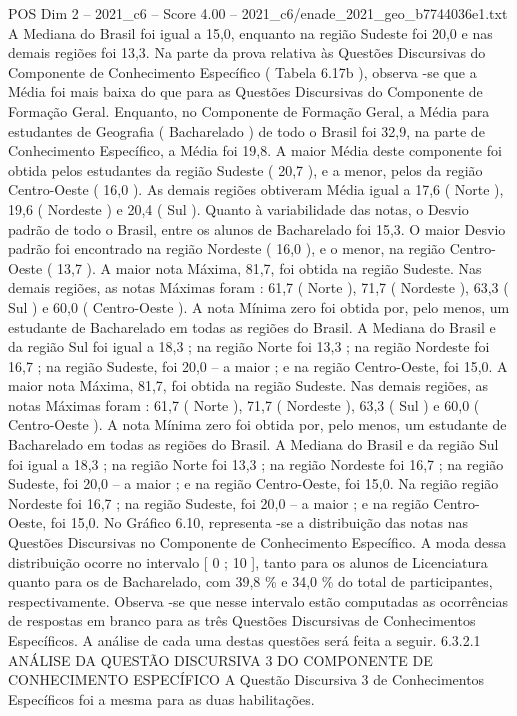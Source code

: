 \begin{textsample}{POS Dim 2 – 2021\_c6 – Score 4.00 – 2021\_c6/enade\_2021\_geo\_b7744036e1.txt}
A Mediana do Brasil foi igual a 15,0, enquanto na região Sudeste foi 20,0 e nas demais regiões foi 13,3.
Na parte da prova relativa às Questões Discursivas do Componente de Conhecimento Específico ( Tabela 6.17b ), observa -se que a Média foi mais baixa do que para as Questões Discursivas do Componente de Formação Geral.
Enquanto, no Componente de Formação Geral, a Média para estudantes de Geografia ( Bacharelado ) de todo o Brasil foi 32,9, na parte de Conhecimento Específico, a Média foi 19,8.
A maior Média deste componente foi obtida pelos estudantes da região Sudeste ( 20,7 ), e a menor, pelos da região Centro-Oeste ( 16,0 ).
As demais regiões obtiveram Média igual a 17,6 ( Norte ), 19,6 ( Nordeste ) e 20,4 ( Sul ).
Quanto à variabilidade das notas, o Desvio padrão de todo o Brasil, entre os alunos de Bacharelado foi 15,3.
O maior Desvio padrão foi encontrado na região Nordeste ( 16,0 ), e o menor, na região Centro-Oeste ( 13,7 ).
A maior nota Máxima, 81,7, foi obtida na região Sudeste.
Nas demais regiões, as notas Máximas foram : 61,7 ( Norte ), 71,7 ( Nordeste ), 63,3 ( Sul ) e 60,0 ( Centro-Oeste ).
A nota Mínima zero foi obtida por, pelo menos, um estudante de Bacharelado em todas as regiões do Brasil.
A Mediana do Brasil e da região Sul foi igual a 18,3 ; na região Norte foi 13,3 ; na região Nordeste foi 16,7 ; na região Sudeste, foi 20,0 – a maior ; e na região Centro-Oeste, foi 15,0.
A maior nota Máxima, 81,7, foi obtida na região Sudeste.
Nas demais regiões, as notas Máximas foram : 61,7 ( Norte ), 71,7 ( Nordeste ), 63,3 ( Sul ) e 60,0 ( Centro-Oeste ).
A nota Mínima zero foi obtida por, pelo menos, um estudante de Bacharelado em todas as regiões do Brasil.
A Mediana do Brasil e da região Sul foi igual a 18,3 ; na região Norte foi 13,3 ; na região Nordeste foi 16,7 ; na região Sudeste, foi 20,0 – a maior ; e na região Centro-Oeste, foi 15,0.
Na região região Nordeste foi 16,7 ; na região Sudeste, foi 20,0 – a maior ; e na região Centro-Oeste, foi 15,0.
No Gráfico 6.10, representa -se a distribuição das notas nas Questões Discursivas no Componente de Conhecimento Específico.
A moda dessa distribuição ocorre no intervalo [ 0 ; 10 ], tanto para os alunos de Licenciatura quanto para os de Bacharelado, com 39,8 \% e 34,0 \% do total de participantes, respectivamente.
Observa -se que nesse intervalo estão computadas as ocorrências de respostas em branco para as três Questões Discursivas de Conhecimentos Específicos.
A análise de cada uma destas questões será feita a seguir. 6.3.2.1 ANÁLISE DA QUESTÃO DISCURSIVA 3 DO COMPONENTE DE CONHECIMENTO ESPECÍFICO A Questão Discursiva 3 de Conhecimentos Específicos foi a mesma para as duas habilitações.

\end{textsample}
